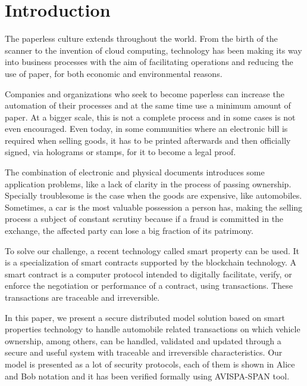 \section{Introduction}
The paperless culture extends throughout the world. 
From the birth of the scanner to the invention of cloud computing, 
technology has been making its way into business processes 
with the aim of facilitating operations and reducing the use of paper, 
for both economic and environmental reasons. 

Companies and organizations who seek to become paperless can increase the automation of their processes and at the same time use a minimum amount of paper.
At a bigger scale, this is not a complete process and in some cases is not even encouraged.
Even today, 
in some communities where an electronic bill is required when selling goods, 
it has to be printed afterwards and then officially signed, 
via holograms or stamps, 
for it to become a legal proof. 

The combination of electronic and physical documents introduces some application problems, 
like a lack of clarity in the process of passing ownership.
Specially troublesome is the case when the goods are expensive, like automobiles.
Sometimes, a car is the most valuable possession a person has, 
making the selling process a subject of constant scrutiny 
because if a fraud is committed in the exchange, 
the affected party can lose a big fraction of its patrimony.

To solve our challenge, a recent technology called smart property can be used. 
It is a specialization of 
smart contracts supported by the blockchain technology.
A smart contract is a computer protocol intended to digitally facilitate,
verify, or enforce the negotiation or performance of a
contract, using transactions. These transactions are traceable
and irreversible.


In this paper, 
we present a secure distributed model solution based on smart properties technology 
to handle automobile related transactions on which vehicle ownership, 
among others, can be handled, validated and updated through a 
secure and useful system with traceable and irreversible characteristics. 
Our model is presented as a lot of security protocols, each of them is shown
in Alice and Bob notation and it has been verified formally using AVISPA-SPAN tool.

